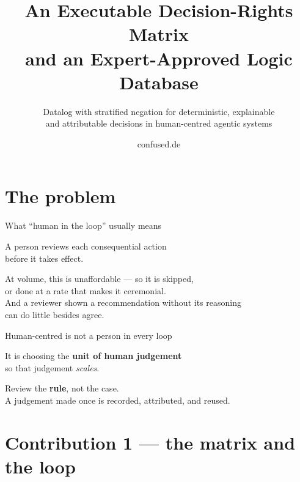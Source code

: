 \documentclass[aspectratio=169,11pt]{beamer}
\title{An Executable Decision-Rights Matrix\\and an Expert-Approved Logic Database}
\subtitle{Datalog with stratified negation for deterministic, explainable\\
and attributable decisions in human-centred agentic systems}
\author{confused.de}
\institute{ACM Europe School on Responsible AI}
\date{}
\begin{document}
\begin{frame}[plain]\titlepage\end{frame}

\section{The problem}

\begin{frame}{What ``human in the loop'' usually means}
  \vspace{1.2em}
  \begin{center}
    {\Large A person reviews each consequential action\\before it takes effect.}
  \end{center}
  \vspace{1.8em}
  \pause
  \begin{center}\color{muted}
    At volume, this is unaffordable --- so it is skipped,\\
    or done at a rate that makes it ceremonial.
    \\[1em]
    And a reviewer shown a recommendation without its reasoning\\
    can do little besides agree.
  \end{center}
\end{frame}

\begin{frame}{Human-centred is not a person in every loop}
  \vspace{1.6em}
  \begin{center}
    {\Large It is choosing the \textbf{unit of human judgement}\\
     so that judgement \emph{scales}.}
  \end{center}
  \vspace{2em}
  \pause
  \begin{center}
    Review the \textbf{rule}, not the case.\\[.6em]
    {\color{muted}A judgement made once is recorded, attributed, and reused.}
  \end{center}
\end{frame}

\section{Contribution 1 --- the matrix and the loop}
\end{document}
